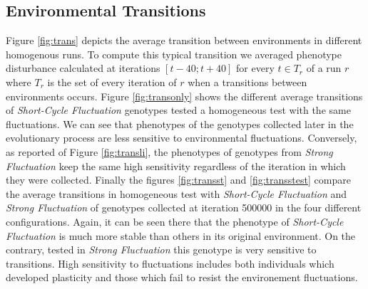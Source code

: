 \subsection{Environmental Transitions} 
Figure \ref{fig:trans} depicts the average transition between environments in different homogenous runs. To compute this typical transition we averaged phenotype disturbance calculated at iterations $[t-40; t + 40]$ for every $t \in T_r$ of a run $r$ where $T_r$ is the set of every iteration of $r$ when a transitions between environments occurs. Figure  \ref{fig:transonly} shows the different average transitions of \emph{Short-Cycle Fluctuation} genotypes tested a homogeneous test with the same fluctuations. We can see that phenotypes of the genotypes collected later in the evolutionary process are less sensitive to environmental fluctuations. Conversely, as reported of Figure \ref{fig:transli}, the phenotypes of genotypes from \emph{Strong Fluctuation} keep the same high sensitivity regardless of the iteration in which they were collected. Finally the figures \ref{fig:transst} and \ref{fig:transstest} compare the average transitions in homogeneous test with \emph{Short-Cycle Fluctuation} and \emph{Strong Fluctuation} of genotypes collected at iteration 500000 in the four different configurations. Again, it can be seen there that the phenotype of \emph{Short-Cycle Fluctuation} is much more stable than others in its original environment. On the contrary, tested in \emph{Strong Fluctuation} this genotype is very sensitive to transitions. High sensitivity to fluctuations includes both individuals which developed plasticity and those which fail to resist the environement fluctuations.


